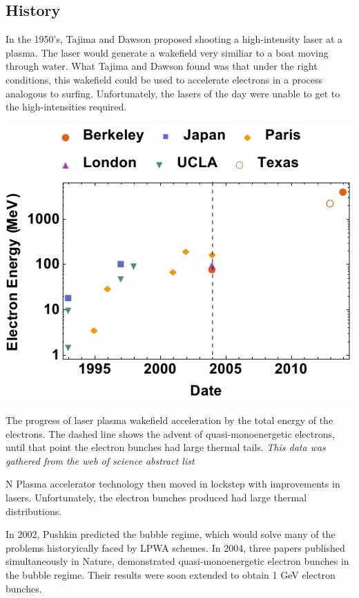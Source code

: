 \documentclass[12pt,letter]{article}
\begin{document}
 \subsection{History}
 In the 1950's, Tajima and Dawson proposed shooting a high-intensity laser at a
 plasma. The laser would generate a wakefield very similiar to a boat moving
 through water. What Tajima and Dawson found was that under the right
 conditions, this wakefield could be used to accelerate electrons in a process
 analogous to surfing. Unfortunately, the lasers of the day were unable to get
 to the high-intensities required.
\begin{marginfigure}
	\includegraphics[width=\marginparwidth]{../figures/datfig.pdf}
    \caption{The progress of laser plasma wakefield acceleration by the total
    energy of the electrons. The dashed line shows the advent of
    quasi-monoenergetic electrons, until that point the electron bunches had
    large thermal tails. \em This data was gathered from the web of science
abstract list}
\end{marginfigure}
N
 Plasma accelerator technology then moved in lockstep with improvements in lasers.
 Unfortunately, the electron bunches produced had large thermal distributions.
 
 In 2002, Pushkin predicted the bubble regime, which would solve many of the
 problems historyically faced by LPWA schemes.\cite{}
 In 2004, three papers published simultaneously in Nature\cite{}, demonstrated
 quasi-monoenergetic electron bunches in the bubble regime. Their results were soon extended to
 obtain 1 GeV electron bunches. 
\end{document}
